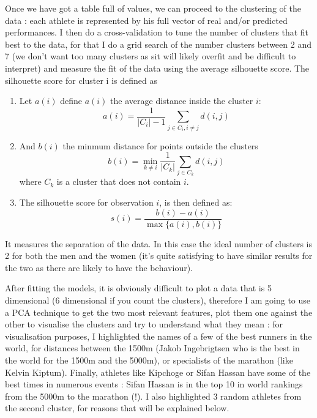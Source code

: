 \documentclass[10pt, a4paper]{article}
\begin{document}
Once we have got a table full of values, we can proceed to the clustering of the data : each athlete is represented by his full vector of real and/or predicted performances. I then do a cross-validation to tune the number of clusters that fit best to the data, for that I do a grid search of the number clusters between 2 and 7 (we don't want too many clusters as sit will likely overfit and be difficult to interpret) and measure the fit of the data using the average silhouette score. The silhouette score for cluster i is defined as 
\begin{enumerate}
    \item Let \( a(i) \) define $a(i)$ the average distance inside the cluster $i$: 
    \[
    a(i) = \frac{1}{|C_i|-1} \sum_{j \in C_i, i \neq j} d(i, j)
    \]

    \item And $b(i)$ the minmum distance for points outside the clusters
    \[
    b(i) = \min_{k \neq i} \frac{1}{|C_k|} \sum_{j \in C_k} d(i, j)
    \]
    where \( C_k \) is a cluster that does not contain $i$.

    \item The silhouette score for observation $i$, is then defined as:
    \[
    s(i) = \frac{b(i) - a(i)}{\max\{a(i), b(i)\}}
    \]
\end{enumerate}

It measures the separation of the data. In this case the ideal number of clusters is 2 for both the men and the women (it's quite satisfying to have similar results for the two as there are likely to have the behaviour).

After fitting the models, it is obviously difficult to plot a data that is 5 dimensional (6 dimensional if you count the clusters), therefore I am going to use a PCA technique to get the two most relevant features, plot them one against the other to visualise the clusters and try to understand what they mean : for visualisation purposes, I highlighted the names of a few of the best runners in the world, for distances between the 1500m (Jakob Ingebrigtsen who is the best in the world for the 1500m and the 5000m), or specialists of the marathon (like Kelvin Kiptum). Finally, athletes like Kipchoge or Sifan Hassan have some of the best times in numerous events : Sifan Hassan is in the top 10 in world rankings from the 5000m to the marathon (!). I also highlighted 3 random athletes from the second cluster, for reasons that will be explained below.
\end{document}
